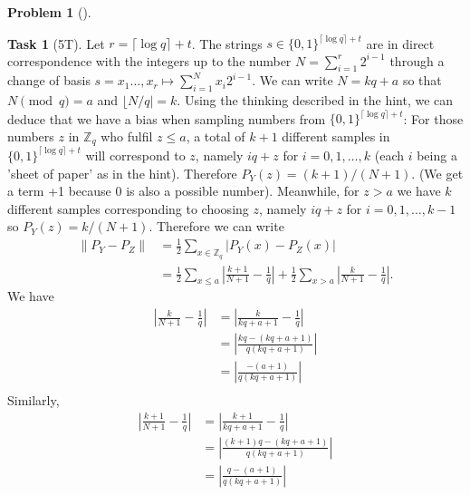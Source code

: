 \documentclass[11pt,twoside]{article}
\theoremstyle{definition}
\newtheorem{amsproblem}{Problem}
\newtheorem{amssubproblem}{Task}[amsproblem]
\newenvironment{problem}[1][]{%
  \begin{amsproblem}[#1]
  }{%
  \end{amsproblem}
}
\newenvironment{subproblem}[1][]{%
  \begin{amssubproblem}[#1]
  }{%
  \end{amssubproblem}
}
\newcommand{\TP}[1]{#1T}
\newcommand{\Z}{\mathbb{Z}}
\begin{document}
\begin{problem}
  \begin{subproblem}[\TP{5}]
    Let $r = \lceil \log q \rceil + t$. The strings $s \in \{0, 1\}^{\lceil \log q \rceil + t}$ are in direct correspondence with the integers up to the number $N  = \sum_{i = 1}^r 2^{i-1}$ through a change of basis $s = x_1\ldots, x_{r} \mapsto \sum_{i = 1}^N x_i 2^{i-1}$. We can write $N = kq + a$ so that $N \pmod{q} =a$ and $\lfloor N/q \rvert = k$. Using the thinking described in the hint, we can deduce that we have a bias when sampling numbers from $\{0, 1\}^{\lceil \log q \rceil + t}$: For those numbers $z$ in $\Z_q$ who fulfil $z \leq a$, a total of $k + 1$ different samples in $\{0, 1\}^{\lceil \log q \rceil + t}$ will correspond to $z$, namely $iq + z$ for $i = 0, 1, \ldots, k$ (each $i$ being a 'sheet of paper' as in the hint). Therefore $P_Y(z)= (k+1)/(N+1)$. (We get a term +1 because 0 is also a possible number). Meanwhile, for $z > a$ we have $k$ different samples corresponding to choosing $z$, namely $iq + z$ for $i = 0, 1, \ldots, k-1$ so $P_Y(z) = k/(N+1)$. Therefore we can write
    \[
    \begin{aligned}
      \lVert P_Y - P_Z \rVert
      &= \frac{1}{2}\sum_{x\in \Z_q} \lvert P_Y(x) - P_Z(x) \rvert \\
      &= \frac{1}{2} \sum_{x \leq a}\left \lvert \frac{k+1}{N+1} - \frac{1}{q} \right \rvert + \frac{1}{2} \sum_{x > a}\left \lvert \frac{k}{N+1} - \frac{1}{q} \right \rvert.
    \end{aligned}
    \]
    We have
    \[
    \begin{aligned}
      \left \lvert\frac{k}{N+1} - \frac{1}{q} \right \rvert
      &=\left \lvert \frac{k}{kq + a +1} - \frac{1}{q} \right \rvert\\
      &=\left \lvert \frac{kq - (kq+a+1)}{q(kq + a +1)} \right \rvert \\
      &=\left \lvert \frac{-(a+1)}{q(kq + a+1)} \right \rvert \\
    \end{aligned}
    \]
    Similarly,
    \[
    \begin{aligned}
      \left \lvert\frac{k+1}{N+1} - \frac{1}{q} \right \rvert
      &=\left \lvert \frac{k+1}{kq + a +1} - \frac{1}{q} \right \rvert\\
      &=\left \lvert \frac{(k+1)q - (kq+a+1)}{q(kq + a +1)} \right \rvert \\
      &=\left \lvert \frac{q-(a+1)}{q(kq + a +1 )} \right \rvert \\
    \end{aligned}
\]
\end{subproblem}
\end{problem}
\end{document}
